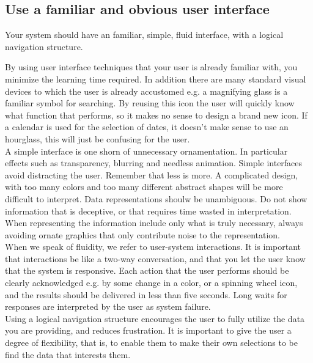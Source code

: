 \subsection{Use a familiar and obvious user interface}

Your system should have an familiar, simple, fluid interface, with a logical navigation structure.

By using user interface techniques that your user is already familiar with, you minimize the learning time required.
In addition there are many standard visual devices to which the user is already accustomed e.g. a magnifying glass is a familiar symbol for searching.
By reusing this icon the user will quickly know what function that performs, so it makes no sense to design a brand new icon.
If a calendar is used for the selection of dates, it doesn't make sense to use an hourglass, this will just be confusing for the user.\\

A simple interface is one shorn of unnecessary ornamentation. In particular effects such as transparency, blurring and needless animation.
Simple interfaces avoid distracting the user. Remember that less is more.
A complicated design, with too many colors and too many different abstract shapes will be more difficult to interpret.
Data representations shoulw be unambiguous.
Do not show information that is deceptive, or that requires time wasted in interpretation.
When representing the information include only what is truly necessary, always avoiding ornate graphics that only contribute noise to the representation.\\

When we speak of fluidity, we refer to user-system interactions.
It is important that interactions be like a two-way conversation, and that you let the user know that the system is responsive.
Each action that the user performs should be clearly acknowledged e.g. by some change in a color, or a spinning wheel icon, and the results should be delivered in less than five seconds.
Long waits for responses are interpreted by the user as system failure.\\
    
Using a logical navigation structure encourages the user to fully utilize the data you are providing, and reduces frustration.
It is important to give the user a degree of flexibility, that is, to enable them to make their own selections to be find the data that interests them.\\

